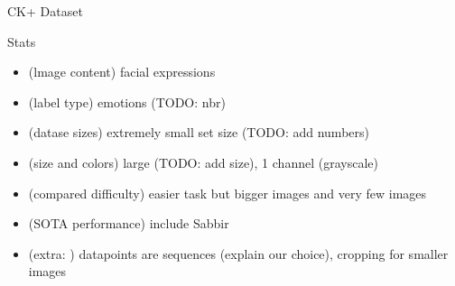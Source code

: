 \documentclass[final]{beamer}
\newlength{\onecolwid}
\begin{document}
\begin{frame}[t]
\begin{columns}[t]
\begin{column}{\onecolwid}
\begin{block}{CK+ Dataset}
\end{block}

\begin{block}{Stats}
\begin{itemize}
\item (lmage content) facial expressions
\item (label type) emotions (TODO: nbr)
\item (datase sizes) extremely small set size (TODO: add numbers)
\item (size and colors) large (TODO: add size), 1 channel (grayscale) 
\item (compared difficulty) easier task but bigger images and very few images
\item (SOTA performance) include Sabbir
\item (extra: ) datapoints are sequences (explain our choice), cropping for smaller images

\end{itemize}
\end{block}





\end{column} %

\end{columns} %

\end{frame} %
\end{document}
